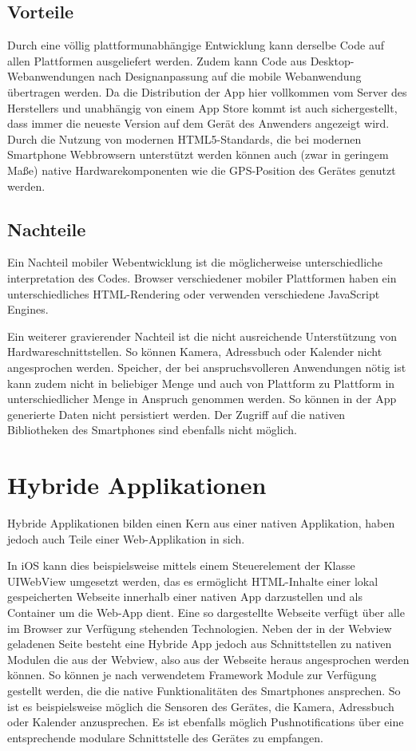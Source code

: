 \subsection{Vorteile}
%
Durch eine völlig plattformunabhängige Entwicklung kann derselbe Code auf allen Plattformen ausgeliefert werden. Zudem kann Code aus Desktop-Webanwendungen nach Designanpassung auf die mobile Webanwendung übertragen werden. Da die Distribution der App hier vollkommen vom Server des Herstellers und unabhängig von einem App Store kommt ist auch sichergestellt, dass immer die neueste Version auf dem Gerät des Anwenders angezeigt wird. Durch die Nutzung von modernen HTML5-Standards, die bei modernen Smartphone Webbrowsern unterstützt werden können auch (zwar in geringem Maße) native Hardwarekomponenten wie die GPS-Position des Gerätes genutzt werden. \cite{browserGPS}

%
\subsection{Nachteile}
%
Ein Nachteil mobiler Webentwicklung ist die möglicherweise unterschiedliche interpretation des Codes. Browser verschiedener mobiler Plattformen haben ein unterschiedliches HTML-Rendering oder verwenden verschiedene JavaScript Engines.

Ein weiterer gravierender Nachteil ist die nicht ausreichende Unterstützung von Hardwareschnittstellen. So können Kamera, Adressbuch oder Kalender nicht angesprochen werden. Speicher, der bei anspruchsvolleren Anwendungen nötig ist kann zudem nicht in beliebiger Menge und auch von Plattform zu Plattform in unterschiedlicher Menge in Anspruch genommen werden. So können in der App generierte Daten nicht persistiert werden. Der Zugriff auf die nativen Bibliotheken des Smartphones sind ebenfalls nicht möglich.
%
%
\section{Hybride Applikationen}
\label{sec:HybrideApplikationen}
%
Hybride Applikationen bilden einen Kern aus einer nativen Applikation, haben jedoch auch Teile einer Web-Applikation in sich.

In iOS kann dies beispielsweise mittels einem Steuerelement der Klasse UIWebView \cite{uiWebView} umgesetzt werden, das es ermöglicht HTML-Inhalte einer lokal gespeicherten Webseite innerhalb einer nativen App darzustellen und als Container um die Web-App dient. Eine so dargestellte Webseite verfügt über alle im Browser zur Verfügung stehenden Technologien. Neben der in der Webview geladenen Seite besteht eine Hybride App jedoch aus Schnittstellen zu nativen Modulen die aus der Webview, also aus der Webseite heraus angesprochen werden können. So können je nach verwendetem Framework Module zur Verfügung gestellt werden, die die native Funktionalitäten des Smartphones ansprechen. So ist es beispielsweise möglich die Sensoren des Gerätes, die Kamera, Adressbuch oder Kalender anzusprechen. Es ist ebenfalls möglich Pushnotifications über eine entsprechende modulare Schnittstelle des Gerätes zu empfangen.  

